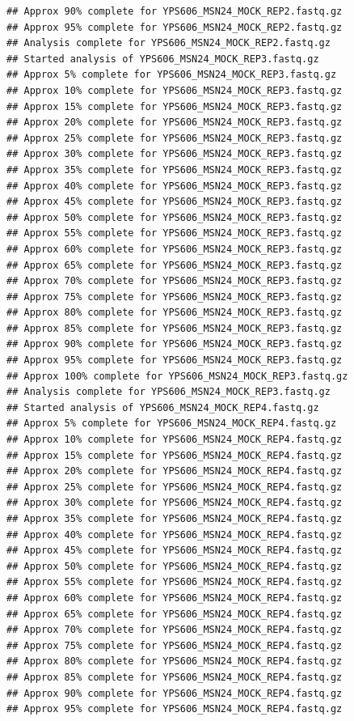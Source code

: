 \documentclass[
]{book}
\begin{document}
\begin{verbatim}
## Approx 90% complete for YPS606_MSN24_MOCK_REP2.fastq.gz
## Approx 95% complete for YPS606_MSN24_MOCK_REP2.fastq.gz
## Analysis complete for YPS606_MSN24_MOCK_REP2.fastq.gz
## Started analysis of YPS606_MSN24_MOCK_REP3.fastq.gz
## Approx 5% complete for YPS606_MSN24_MOCK_REP3.fastq.gz
## Approx 10% complete for YPS606_MSN24_MOCK_REP3.fastq.gz
## Approx 15% complete for YPS606_MSN24_MOCK_REP3.fastq.gz
## Approx 20% complete for YPS606_MSN24_MOCK_REP3.fastq.gz
## Approx 25% complete for YPS606_MSN24_MOCK_REP3.fastq.gz
## Approx 30% complete for YPS606_MSN24_MOCK_REP3.fastq.gz
## Approx 35% complete for YPS606_MSN24_MOCK_REP3.fastq.gz
## Approx 40% complete for YPS606_MSN24_MOCK_REP3.fastq.gz
## Approx 45% complete for YPS606_MSN24_MOCK_REP3.fastq.gz
## Approx 50% complete for YPS606_MSN24_MOCK_REP3.fastq.gz
## Approx 55% complete for YPS606_MSN24_MOCK_REP3.fastq.gz
## Approx 60% complete for YPS606_MSN24_MOCK_REP3.fastq.gz
## Approx 65% complete for YPS606_MSN24_MOCK_REP3.fastq.gz
## Approx 70% complete for YPS606_MSN24_MOCK_REP3.fastq.gz
## Approx 75% complete for YPS606_MSN24_MOCK_REP3.fastq.gz
## Approx 80% complete for YPS606_MSN24_MOCK_REP3.fastq.gz
## Approx 85% complete for YPS606_MSN24_MOCK_REP3.fastq.gz
## Approx 90% complete for YPS606_MSN24_MOCK_REP3.fastq.gz
## Approx 95% complete for YPS606_MSN24_MOCK_REP3.fastq.gz
## Approx 100% complete for YPS606_MSN24_MOCK_REP3.fastq.gz
## Analysis complete for YPS606_MSN24_MOCK_REP3.fastq.gz
## Started analysis of YPS606_MSN24_MOCK_REP4.fastq.gz
## Approx 5% complete for YPS606_MSN24_MOCK_REP4.fastq.gz
## Approx 10% complete for YPS606_MSN24_MOCK_REP4.fastq.gz
## Approx 15% complete for YPS606_MSN24_MOCK_REP4.fastq.gz
## Approx 20% complete for YPS606_MSN24_MOCK_REP4.fastq.gz
## Approx 25% complete for YPS606_MSN24_MOCK_REP4.fastq.gz
## Approx 30% complete for YPS606_MSN24_MOCK_REP4.fastq.gz
## Approx 35% complete for YPS606_MSN24_MOCK_REP4.fastq.gz
## Approx 40% complete for YPS606_MSN24_MOCK_REP4.fastq.gz
## Approx 45% complete for YPS606_MSN24_MOCK_REP4.fastq.gz
## Approx 50% complete for YPS606_MSN24_MOCK_REP4.fastq.gz
## Approx 55% complete for YPS606_MSN24_MOCK_REP4.fastq.gz
## Approx 60% complete for YPS606_MSN24_MOCK_REP4.fastq.gz
## Approx 65% complete for YPS606_MSN24_MOCK_REP4.fastq.gz
## Approx 70% complete for YPS606_MSN24_MOCK_REP4.fastq.gz
## Approx 75% complete for YPS606_MSN24_MOCK_REP4.fastq.gz
## Approx 80% complete for YPS606_MSN24_MOCK_REP4.fastq.gz
## Approx 85% complete for YPS606_MSN24_MOCK_REP4.fastq.gz
## Approx 90% complete for YPS606_MSN24_MOCK_REP4.fastq.gz
## Approx 95% complete for YPS606_MSN24_MOCK_REP4.fastq.gz

\end{verbatim}
\end{document}
